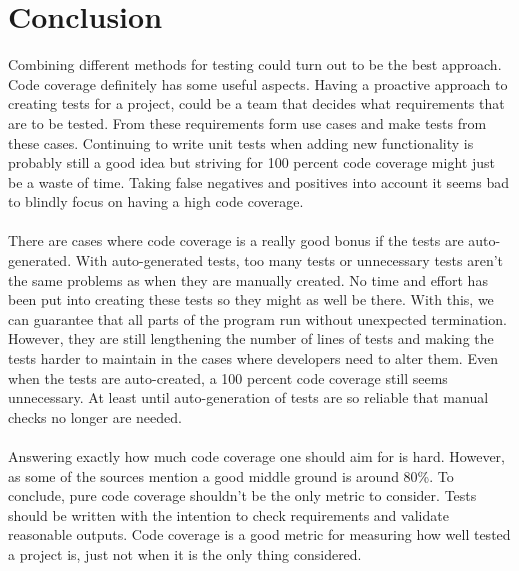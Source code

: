 \documentclass{article}
\begin{document}
\section{Conclusion}
Combining different methods for testing could turn out to be the best approach. Code coverage definitely has some useful aspects. Having a proactive approach to creating tests for a project, could be a team that decides what requirements that are to be tested. From these requirements form use cases and make tests from these cases. Continuing to write unit tests when adding new functionality is probably still a good idea but striving for 100 percent code coverage might just be a waste of time. Taking false negatives and positives into account it seems bad to blindly focus on having a high code coverage.
\\\\
There are cases where code coverage is a really good bonus if the tests are auto-generated. With auto-generated tests, too many tests or unnecessary tests aren't the same problems as when they are manually created. No time and effort has been put into creating these tests so they might as well be there. With this, we can guarantee that all parts of the program run without unexpected termination. However, they are still lengthening the number of lines of tests and making the tests harder to maintain in the cases where developers need to alter them. Even when the tests are auto-created, a 100 percent code coverage still seems unnecessary. At least until auto-generation of tests are so reliable that manual checks no longer are needed.
\\\\ 
Answering exactly how much code coverage one should aim for is hard. However, as some of the sources mention a good middle ground is around 80\%. To conclude, pure code coverage shouldn't be the only metric to consider. Tests should be written with the intention to check requirements and validate reasonable outputs. Code coverage is a good metric for measuring how well tested a project is, just not when it is the only thing considered.

\newpage
\end{document}
